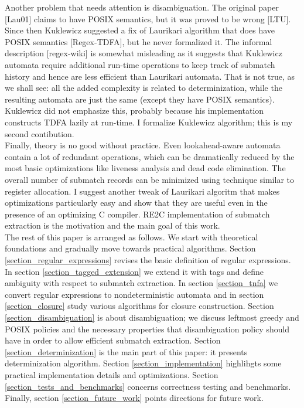 \documentclass{article}
\theoremstyle{definition}
\begin{document}
\begin{multicols}{2}
Another problem that needs attention is disambiguation.
The original paper [Lau01] claims to have POSIX semantics, but it was proved to be wrong [LTU].
Since then Kuklewicz suggested a fix of Laurikari algorithm that does have POSIX semantics [Regex-TDFA], but he never formalized it.
The informal description [regex-wiki] is somewhat misleading as it suggests that Kuklewicz automata
require additional run-time operations to keep track of submatch history and hence are less efficient than Laurikari automata.
That is not true, as we shall see: all the added complexity is related to determinization,
while the resulting automata are just the same (except they have POSIX semantics).
Kuklewicz did not emphasize this, probably because his implementation constructs TDFA lazily at run-time.
I formalize Kuklewicz algorithm; this is my second contibution.
\\

Finally, theory is no good without practice.
Even lookahead-aware automata contain a lot of redundant operations,
which can be dramatically reduced by the most basic optimizations like liveness analysis and dead code elimination.
The overall number of submatch records can be minimized using technique similar to register allocation.
I suggest another tweak of Laurikari algoritm that makes optimizations particularly easy
and show that they are useful even in the presence of an optimizing C compiler.
RE2C implementation of submatch extraction is the motivation and the main goal of this work.
\\

The rest of this paper is arranged as follows.
We start with theoretical foundations and gradually move towards practical algorithms.
Section \ref{section_regular_expressions} revises the basic definition of regular expressions.
In section \ref{section_tagged_extension} we extend it with tags
and define ambiguity with respect to submatch extraction.
In section \ref{section_tnfa} we convert regular expressions to nondeterministic automata
and in section \ref{section_closure} study various algorithms for closure construction.
Section \ref{section_disambiguation} is about disambiguation;
we discuss leftmost greedy and POSIX policies and the necessary properties that disambiguation policy should have in order to allow efficient submatch extraction.
Section \ref{section_determinization} is the main part of this paper: it presents determinization algorithm.
Section \ref{section_implementation} highlihgts some practical implementation details and optimizations.
Section \ref{section_tests_and_benchmarks} concerns correctness testing and benchmarks.
Finally, section \ref{section_future_work} points directions for future work.


\end{multicols}
\end{document}
